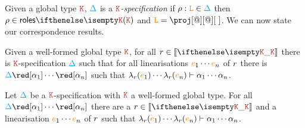 Given a global type $\aK$, $\textcolor{cyan}{\Delta}$ is a \emph{$\aK$-specification} if
$\rho : \texttt{\textcolor{orange}L} \in \textcolor{cyan}{\Delta}$ then $\arole \in \roles{\aK}$ and
$\aL = \proj[@][@][\ ]$.
%
We can now state our correspondence results.
%
\begin{theorem}\label{thm:gt2local}
  Given a well-formed global type $\aK$, for all $\apom \in \ksem \aK$
  there is $\aK$-specification $\textcolor{cyan}{\Delta}$ such that for all
  linearisations ${\color{orange}{e}}_1 \cdots {\color{orange}{e}}_n$ of $r$ there is
  $\envmv \red[\alpha_1] \cdots \red[\alpha_n]$ such that
  $\lambda_{r}({\color{orange}{e}}_1) \cdots \lambda_{r}({\color{orange}{e}}_n) \vdash \alpha_1
  \cdots \alpha_n$.
\end{theorem}
%
\begin{theorem}\label{thm:local2gt}
  Let $\textcolor{cyan}{\Delta}$ be a $\aK$-specification with $\aK$ a well-formed
  global type.
  For all $\envmv \red[\alpha_1] \cdots \red[\alpha_n]$ there are a
  $\apom \in \ksem \aK$ and a linearisation ${\color{orange}{e}}_1 \cdots {\color{orange}{e}}_n$ of
  $r$ such that
  $\lambda_{r}({\color{orange}{e}}_1) \cdots \lambda_{r}({\color{orange}{e}}_n) \vdash \alpha_1
  \cdots \alpha_n$.
\end{theorem}

